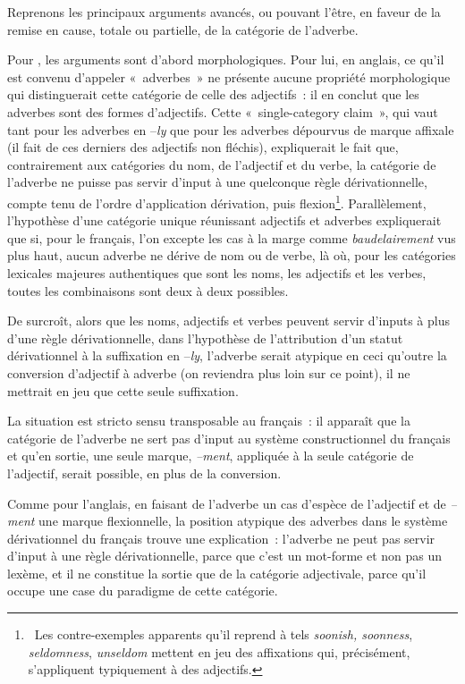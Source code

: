 \documentclass[output=paper]{langsci/langscibook}
\begin{document}
\largerpage
Reprenons les principaux arguments avancés, ou pouvant l'être, en faveur de la remise en cause, totale ou partielle, de la catégorie de l'adverbe.

Pour %
\citet{Giegerich12}%
%
, les arguments sont d'abord morphologiques. Pour lui, en anglais, ce qu'il est convenu d'appeler «~adverbes~» ne présente aucune propriété morphologique qui distinguerait cette catégorie de celle des adjectifs~: il en conclut que les adverbes sont des formes d'adjectifs. Cette «~single-category claim~», qui vaut tant pour les adverbes en --\emph{ly} que pour les adverbes dépourvus de marque affixale (il fait de ces derniers des adjectifs non fléchis), expliquerait le fait que, contrairement aux catégories du nom, de l'adjectif et du verbe, la catégorie de l'adverbe ne puisse pas servir d'input à une quelconque règle dérivationnelle, compte tenu de l'ordre d'application dérivation, puis flexion\footnote{~Les contre-exemples apparents qu'il reprend à %
\citet[63]{Payne10} %
%
tels \emph{soonish, soonness}, \emph{seldomness}, \emph{unseldom} mettent en jeu des affixations qui, précisément, s'appliquent typiquement à des adjectifs.}. Parallèlement, l'hypothèse d'une catégorie unique réunissant adjectifs et adverbes expliquerait que si, pour le français, l'on excepte les cas à la marge comme \emph{baudelairement} vus plus haut, aucun adverbe ne dérive de nom ou de verbe, là où, pour les catégories lexicales majeures authentiques que sont les noms, les adjectifs et les verbes, toutes les combinaisons sont deux à deux possibles.

De surcroît, alors que les noms, adjectifs et verbes peuvent servir d'inputs à plus d'une règle dérivationnelle, dans l'hypothèse de l'attribution d'un statut dérivationnel à la suffixation en --\emph{ly}, l'adverbe serait atypique en ceci qu'outre la conversion d'adjectif à adverbe (on reviendra plus loin sur ce point), il ne mettrait en jeu que cette seule suffixation.

La situation est stricto sensu transposable au français~: il apparaît que la catégorie de l'adverbe ne sert pas d'input au système constructionnel du français et qu'en sortie, une seule marque, \emph{--ment}, appliquée à la seule catégorie de l'adjectif, serait possible, en plus de la conversion.

Comme pour l'anglais, en faisant de l'adverbe un cas d'espèce de l'adjectif et de \emph{--ment} une marque flexionnelle, la position atypique des adverbes dans le système dérivationnel du français trouve une explication~: l'adverbe ne peut pas servir d'input à une règle dérivationnelle, parce que c'est un mot-forme et non pas un lexème, et il ne constitue la sortie que de la catégorie adjectivale, parce qu'il occupe une case du paradigme de cette catégorie.
\end{document}
